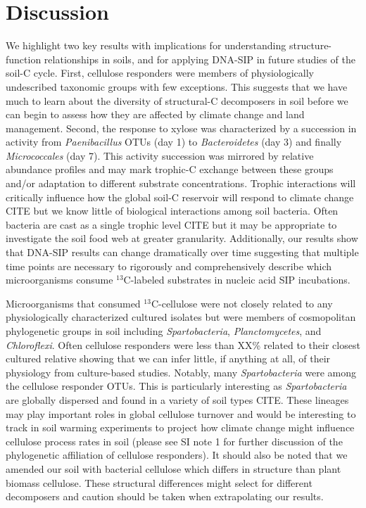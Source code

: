 \section{Discussion} 
We highlight two key results with implications for understanding structure-function
relationships in soils, and for applying DNA-SIP in future studies of the soil-C
cycle. First, cellulose responders were members of physiologically undescribed
taxonomic groups with few exceptions. This suggests that we have much to learn
about the diversity of structural-C decomposers in soil before we can begin to
assess how they are affected by climate change and land management. Second, the
response to xylose was characterized by a succession in activity from
\textit{Paenibacillus} OTUs (day 1) to \textit{Bacteroidetes} (day 3) and finally
\textit{Micrococcales} (day 7). This activity succession was mirrored by relative
abundance profiles and may mark trophic-C exchange between these groups and/or
adaptation to different substrate concentrations. Trophic interactions will
critically influence how the global soil-C reservoir will respond to climate
change CITE but we know little of biological interactions among soil bacteria.
Often bacteria are cast as a single trophic level CITE but it may be
appropriate to investigate the soil food web at greater granularity.
Additionally, our results show that DNA-SIP results can change dramatically
over time suggesting that multiple time points are necessary to rigorously and
comprehensively describe which microorganisms consume $^{13}$C-labeled
substrates in nucleic acid SIP incubations.

Microorganisms that consumed $^{13}$C-cellulose were not closely related to any
physiologically characterized cultured isolates but were members of
cosmopolitan phylogenetic groups in soil including \textit{Spartobacteria},
\textit{Planctomycetes}, and \textit{Chloroflexi}. Often cellulose responders
were less than XX\% related to their closest cultured relative showing that we
can infer little, if anything at all, of their physiology from culture-based
studies. Notably, many \textit{Spartobacteria} were among the cellulose responder OTUs.
This is particularly interesting as \textit{Spartobacteria} are globally
dispersed and found in a variety of soil types CITE. These lineages may play
important roles in global cellulose turnover and would be interesting to track
in soil warming experiments to project how climate change might influence
cellulose process rates in soil (please see SI note 1 for further discussion of the
phylogenetic affiliation of cellulose responders). It should also be noted that
we amended our soil with bacterial cellulose which differs in structure than
plant biomass cellulose. These structural differences might select for different 
decomposers and caution should be taken when extrapolating our results.

